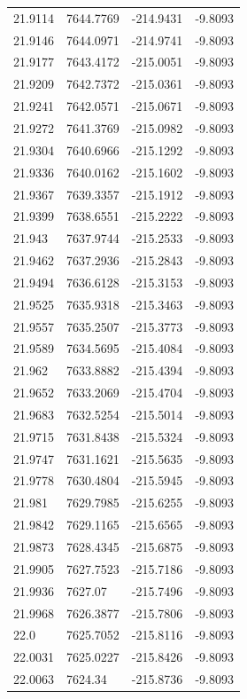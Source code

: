 \begin{table}[H]
\begin{tabular}{llll}
21.9114 & 7644.7769 & -214.9431 & -9.8093 \\
21.9146 & 7644.0971 & -214.9741 & -9.8093 \\
21.9177 & 7643.4172 & -215.0051 & -9.8093 \\
21.9209 & 7642.7372 & -215.0361 & -9.8093 \\
21.9241 & 7642.0571 & -215.0671 & -9.8093 \\
21.9272 & 7641.3769 & -215.0982 & -9.8093 \\
21.9304 & 7640.6966 & -215.1292 & -9.8093 \\
21.9336 & 7640.0162 & -215.1602 & -9.8093 \\
21.9367 & 7639.3357 & -215.1912 & -9.8093 \\
21.9399 & 7638.6551 & -215.2222 & -9.8093 \\
21.943 & 7637.9744 & -215.2533 & -9.8093 \\
21.9462 & 7637.2936 & -215.2843 & -9.8093 \\
21.9494 & 7636.6128 & -215.3153 & -9.8093 \\
21.9525 & 7635.9318 & -215.3463 & -9.8093 \\
21.9557 & 7635.2507 & -215.3773 & -9.8093 \\
21.9589 & 7634.5695 & -215.4084 & -9.8093 \\
21.962 & 7633.8882 & -215.4394 & -9.8093 \\
21.9652 & 7633.2069 & -215.4704 & -9.8093 \\
21.9683 & 7632.5254 & -215.5014 & -9.8093 \\
21.9715 & 7631.8438 & -215.5324 & -9.8093 \\
21.9747 & 7631.1621 & -215.5635 & -9.8093 \\
21.9778 & 7630.4804 & -215.5945 & -9.8093 \\
21.981 & 7629.7985 & -215.6255 & -9.8093 \\
21.9842 & 7629.1165 & -215.6565 & -9.8093 \\
21.9873 & 7628.4345 & -215.6875 & -9.8093 \\
21.9905 & 7627.7523 & -215.7186 & -9.8093 \\
21.9936 & 7627.07 & -215.7496 & -9.8093 \\
21.9968 & 7626.3877 & -215.7806 & -9.8093 \\
22.0 & 7625.7052 & -215.8116 & -9.8093 \\
22.0031 & 7625.0227 & -215.8426 & -9.8093 \\
22.0063 & 7624.34 & -215.8736 & -9.8093 \\

\end{tabular}
\end{table}
